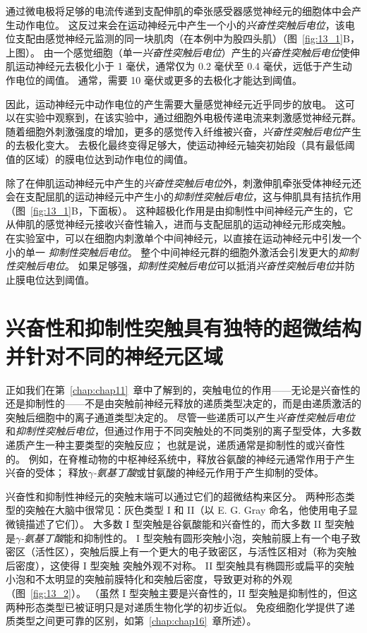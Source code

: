 通过微电极将足够的电流传递到支配伸肌的牵张感受器感觉神经元的细胞体中会产生动作电位。
这反过来会在运动神经元中产生一个小的\textit{兴奋性突触后电位}，该电位支配由感觉神经元监测的同一块肌肉（在本例中为股四头肌）（图~\ref{fig:13_1}B，上图）。
由一个感觉细胞（单一\textit{兴奋性突触后电位}）产生的\textit{兴奋性突触后电位}使伸肌运动神经元去极化小于 1 毫伏，通常仅为 0.2 毫伏至 0.4 毫伏，远低于产生动作电位的阈值。
通常，需要 10 毫伏或更多的去极化才能达到阈值。


因此，运动神经元中动作电位的产生需要大量感觉神经元近乎同步的放电。
这可以在实验中观察到，在该实验中，通过细胞外电极传递电流来刺激感觉神经元群。
随着细胞外刺激强度的增加，更多的感觉传入纤维被兴奋，\textit{兴奋性突触后电位}产生的去极化变大。
去极化最终变得足够大，使运动神经元轴突初始段（具有最低阈值的区域）的膜电位达到动作电位的阈值。


除了在伸肌运动神经元中产生的\textit{兴奋性突触后电位}外，刺激伸肌牵张受体神经元还会在支配屈肌的运动神经元中产生小的\textit{抑制性突触后电位}，这与伸肌具有拮抗作用（图~\ref{fig:13_1}B，下面板）。
这种超极化作用是由抑制性中间神经元产生的，它从伸肌的感觉神经元接收兴奋性输入，进而与支配屈肌的运动神经元形成突触。
在实验室中，可以在细胞内刺激单个中间神经元，以直接在运动神经元中引发一个小的单一 \textit{抑制性突触后电位}。
整个中间神经元群的细胞外激活会引发更大的\textit{抑制性突触后电位}。
如果足够强，\textit{抑制性突触后电位}可以抵消\textit{兴奋性突触后电位}并防止膜电位达到阈值。



\section{兴奋性和抑制性突触具有独特的超微结构并针对不同的神经元区域}

正如我们在第~\ref{chap:chap11}~章中了解到的，突触电位的作用——无论是兴奋性的还是抑制性的——不是由突触前神经元释放的递质类型决定的，而是由递质激活的突触后细胞中的离子通道类型决定的。
尽管一些递质可以产生\textit{兴奋性突触后电位}和\textit{抑制性突触后电位}，但通过作用于不同突触处的不同类别的离子型受体，大多数递质产生一种主要类型的突触反应；
也就是说，递质通常是抑制性的或兴奋性的。
例如，在脊椎动物的中枢神经系统中，释放谷氨酸的神经元通常作用于产生兴奋的受体；
释放\textit{$\gamma$-氨基丁酸}或甘氨酸的神经元作用于产生抑制的受体。


兴奋性和抑制性神经元的突触末端可以通过它们的超微结构来区分。
两种形态类型的突触在大脑中很常见：灰色类型 I 和 II（以 E. G. Gray 命名，他使用电子显微镜描述了它们）。
大多数 I 型突触是谷氨酸能和兴奋性的，而大多数 II 型突触是\textit{$\gamma$-氨基丁酸}能和抑制性的。
I 型突触有圆形突触小泡，突触前膜上有一个电子致密区（活性区），突触后膜上有一个更大的电子致密区，与活性区相对（称为突触后密度），这使得 I 型突触 突触外观不对称。 
II 型突触具有椭圆形或扁平的突触小泡和不太明显的突触前膜特化和突触后密度，导致更对称的外观（图~\ref{fig:13_2}）。 
（虽然 I 型突触主要是兴奋性的，II 型突触是抑制性的，但这两种形态类型已被证明只是对递质生物化学的初步近似。
免疫细胞化学提供了递质类型之间更可靠的区别，如第~\ref{chap:chap16}~章所述）。


